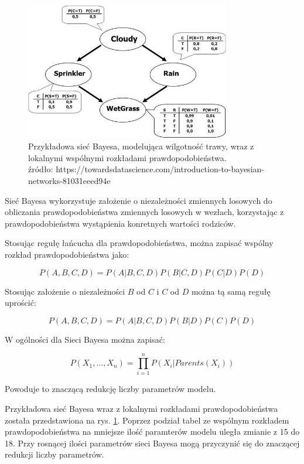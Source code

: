 \documentclass{article}
\begin{document}
\begin{figure}
\centering
	\includegraphics[width=0.80\textwidth]{net.jpeg}\par\vspace{1cm}
\caption{Przykładowa sieć Bayesa, modelująca wilgotność trawy, wraz z lokalnymi wspólnymi rozkładami prawdopodobieństwa. \\ źródło: https://towardsdatascience.com/introduction-to-bayesian-networks-81031eeed94e}
	\label{fig:net}
\end{figure}

Sieć Bayesa wykorzystuje założenie o niezależności zmiennych losowych do obliczania prawdopodobieństwa zmiennych losowych w wezłach, korzystając z prawdopodobieństwa wystąpienia konretnych wartości rodziców. 

Stosując regułę łańcucha dla prawdopodobieństwa, można zapisać wspólny rozkład prawdopodobieństwa jako:

\begin{equation}
	P(A, B, C, D) = P(A|B, C, D)P(B|C, D)P(C|D)P(D)
\end{equation}

Stosując założenie o niezależności $B$ od $C$ i $C$ od $D$ można tą samą regułę uprościć:

\begin{equation}
	P(A, B, C, D) = P(A|B, C, D)P(B|D)P(C)P(D)
\end{equation}

W ogólności dla Sieci Bayesa można zapisać:

\begin{equation}
	P(X_1, ... , X_n) = \prod_{i=1}^{n} P(X_i|Parents(X_i))
\end{equation}

Powoduje to znaczącą redukcję liczby parametrów modelu.

Przykładowa sieć Bayesa wraz z lokalnymi rozkładami prawdopodobieństwa została przedstawiona na rys. \ref{fig:net}. Poprzez podział tabel ze wspólnym rozkładem prawdopodobieństwa na mniejsze ilość paramterów modelu uległa zmianie z 15 do 18. Przy rosnącej ilości parametrów sieci Bayesa mogą przyczynić się do znaczącej redukcji liczby parametrów.
\end{document}
